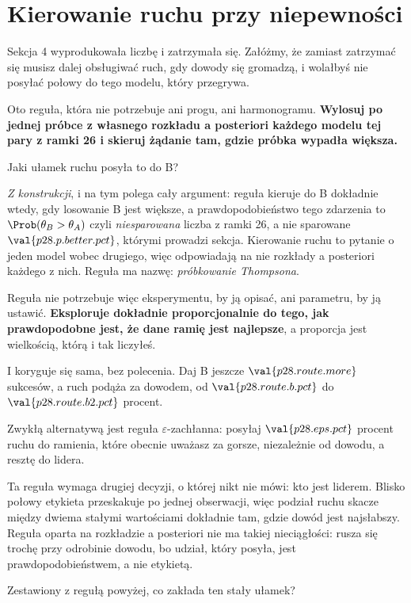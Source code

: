 \section{Kierowanie ruchu przy niepewności}
\label{sec:P28-routing}

\begin{fr}
Sekcja 4 wyprodukowała liczbę i zatrzymała się. Załóżmy, że zamiast zatrzymać
się musisz dalej obsługiwać ruch, gdy dowody się gromadzą, i wolałbyś nie
posyłać połowy do tego modelu, który przegrywa.

Oto reguła, która nie potrzebuje ani progu, ani harmonogramu. \textbf{Wylosuj
po jednej próbce z własnego rozkładu a posteriori każdego modelu \dash{} tej
pary z ramki 26 \dash{} i skieruj żądanie tam, gdzie próbka wypadła
większa.}

Jaki ułamek ruchu posyła to do B?
\dotline
\nextframe
\end{fr}

\begin{fr}

\emph{Z konstrukcji}, i na tym polega cały argument: reguła kieruje do B
dokładnie wtedy, gdy losowanie B jest większe, a prawdopodobieństwo tego
zdarzenia to $\Prob(\theta_B > \theta_A)$ \dash{} czyli \emph{niesparowana}
liczba
z ramki 26, a nie sparowane $\val{p28.p.better.pct}$, którymi prowadzi
sekcja. Kierowanie ruchu to pytanie o jeden model wobec drugiego, więc
odpowiadają na nie rozkłady a posteriori każdego z nich. Reguła ma nazwę:
\emph{próbkowanie Thompsona}.

Reguła nie potrzebuje więc eksperymentu, by ją opisać, ani parametru, by ją
ustawić. \textbf{Eksploruje dokładnie proporcjonalnie do tego, jak
prawdopodobne jest, że dane ramię jest najlepsze}, a proporcja jest wielkością,
którą i tak liczyłeś.

\end{fr}

\begin{fr}
I koryguje się sama, bez polecenia. Daj B jeszcze
$\val{p28.route.more}$ sukcesów, a ruch podąża za dowodem, od
$\val{p28.route.b.pct}$ do $\val{p28.route.b2.pct}$ procent.

Zwykłą alternatywą jest reguła $\varepsilon$-zachłanna: posyłaj
$\val{p28.eps.pct}$ procent ruchu do ramienia, które obecnie uważasz za
gorsze, niezależnie od dowodu, a resztę do lidera.

Ta reguła wymaga drugiej decyzji, o której nikt nie mówi: kto jest liderem.
Blisko połowy etykieta przeskakuje po jednej obserwacji, więc podział ruchu
skacze między dwiema stałymi wartościami dokładnie tam, gdzie dowód jest
najsłabszy. Reguła oparta na rozkładzie a posteriori nie ma takiej
nieciągłości: rusza się trochę przy odrobinie dowodu, bo udział, który posyła,
jest prawdopodobieństwem, a nie etykietą.

Zestawiony z regułą powyżej, co zakłada ten stały ułamek?
\dotline
\nextframe
\end{fr}

